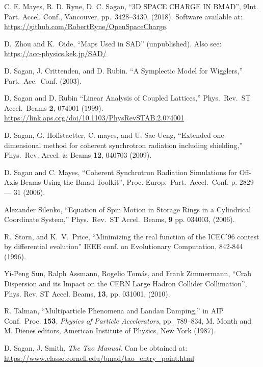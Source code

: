 \begin{thebibliography}{XXXXXXX99}
C. E. Mayes, R. D. Ryne, D. C. Sagan, 
``3D SPACE CHARGE IN BMAD'',
9\Th Int. Part. Accel. Conf., Vancouver, pp.~3428--3430, (2018).
Software available at: \url{https://github.com/RobertRyne/OpenSpaceCharge}.

D.~Zhou and K.~Oide, ``Maps Used in SAD'' (unpublished).
Also see:
\hfill\break
\hspace*{0.3in} \url{https://acc-physics.kek.jp/SAD/}

D. Sagan, J. Crittenden, and D. Rubin.
``A Symplectic Model for Wigglers,'' Part.\ Acc.\ Conf. (2003).

D. Sagan and D. Rubin ``Linear Analysis of Coupled Lattices,''
Phys.\ Rev.\ ST Accel.\ Beams {\bf 2}, 074001 (1999).
\hfill\break
\hspace*{20pt} 
\url{https://link.aps.org/doi/10.1103/PhysRevSTAB.2.074001}

D. Sagan, G. Hoffstaetter, C. mayes, and U. Sae-Ueng,
``Extended one-dimensional method for coherent synchrotron radiation including shielding,''
Phys.\ Rev. Accel. \& Beams {\bf 12}, 040703 (2009).

D. Sagan and C. Mayes, 
``Coherent Synchrotron Radiation Simulations for Off-Axis Beams Using the Bmad Toolkit'',
Proc. Europ.\ Part.\ Accel.\ Conf. p. 2829 --- 31 (2006).

Alexander Silenko, 
``Equation of Spin Motion in Storage Rings in a Cylindrical Coordinate System,''
Phys.\ Rev.\ ST Accel.\ Beams, {\bf 9} pp. 034003, (2006).


R.~Storn, and K.~V.~Price, ``Minimizing the real function of the
ICEC'96 contest by differential evolution'' IEEE conf. on Evolutionary
Computation, 842-844 (1996).

Yi-Peng Sun, Ralph Assmann, Rogelio Tom\'as, and Frank Zimmermann,
``Crab Dispersion and its Impact on the CERN Large Hadron Collider Collimation'',
Phys. Rev. ST Accel. Beams, {\bf 13}, pp. 031001, (2010).

 R. Talman, ``Multiparticle Phenomena and
Landau Damping,'' in AIP Conf.\ Proc.  {\bf 153}, {\em Physics of
Particle Accelerators}, pp.~789--834, M. Month and M. Dienes editors,
American Institute of Physics, New York (1987).

D. Sagan, J. Smith, {\it The Tao Manual}.
Can be obtained at: \hfill\break
\hspace*{0.3in}
\url{https://www.classe.cornell.edu/bmad/tao_entry_point.html}


\end{thebibliography}
